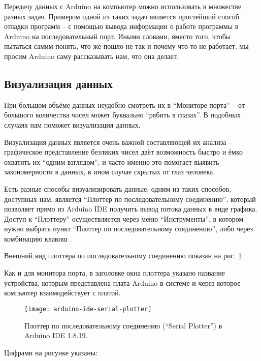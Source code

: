 \documentclass[../sparc.tex]{subfiles}
\begin{document}
Передачу данных с Arduino на компьютер можно использовать в множестве разных
задач. Примером одной из таких задач является простейший способ отладки программ
-- с помощью вывода информации о работе программы в Arduino на последовательный
порт. Иными словами, вместо того, чтобы пытаться самим понять, что же пошло не
так и почему что-то не работает, мы просим Arduino саму рассказывать нам, что
она делает.

\subsection{Визуализация данных}

При большом объёме данных неудобно смотреть их в ``Мониторе порта'' -- от
большого количества чисел может буквально ``рябить в глазах''.  В подобных
случаях нам поможет визуализация данных.

Визуализация данных является очень важной составляющей их анализа -- графическое
представление безликих чисел даёт возможность быстро и ёмко охватить их ``одним
взглядом'', и часто именно это помогает выявить закономерности в данных, в ином
случае скрытых от глаз человека.

Есть разные способы визуализировать данные; одним из таких способов, доступных
нам, является ``Плоттер по последовательному соединению'', который позволяет
прямо из Arduino IDE получить вывод потока данных в виде графика.  Доступ к
``Плоттеру'' осуществляется через меню ``Инструменты'', в котором нужно выбрать
пункт ``Плоттер по последовательному соединению'', либо через комбинацию клавиш
.

Внешний вид плоттера по последовательному соединению показан на
рис. \ref{fig:arduino-ide-serial-plotter}.

Как и для монитора порта, в заголовке окна плоттера указано название устройства,
которым представлена плата Arduino в системе и через которое компьютер
взаимодействует с платой.

\begin{figure}[ht]
  \centering
  \texttt{[image: arduino-ide-serial-plotter]}
  \caption{Плоттер по последовательному соединению (``Serial Plotter'') в
    Arduino IDE 1.8.19.}
  \label{fig:arduino-ide-serial-plotter}
\end{figure}

Цифрами на рисунке указаны:
\end{document}
